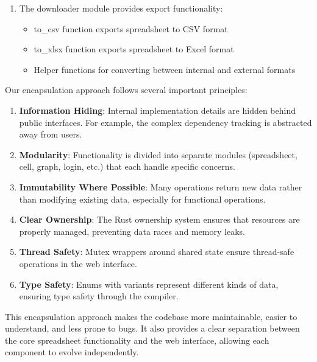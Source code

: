 \documentclass[10pt,a4paper]{article}  %
\begin{document}
\begin{enumerate}
\item The downloader module provides export functionality:
\begin{itemize}
    \item to\_csv function exports spreadsheet to CSV format
    \item to\_xlsx function exports spreadsheet to Excel format
    \item Helper functions for converting between internal and external formats
\end{itemize}
\end{enumerate}

Our encapsulation approach follows several important principles:
\begin{enumerate}
    \item \textbf{Information Hiding}: Internal implementation details are hidden behind public interfaces. For example, the complex dependency tracking is abstracted away from users.
    
    \item \textbf{Modularity}: Functionality is divided into separate modules (spreadsheet, cell, graph, login, etc.) that each handle specific concerns.
    
    \item \textbf{Immutability Where Possible}: Many operations return new data rather than modifying existing data, especially for functional operations.
    
    \item \textbf{Clear Ownership}: The Rust ownership system ensures that resources are properly managed, preventing data races and memory leaks.
    
    \item \textbf{Thread Safety}: Mutex wrappers around shared state ensure thread-safe operations in the web interface.
    
    \item \textbf{Type Safety}: Enums with variants represent different kinds of data, ensuring type safety through the compiler.
\end{enumerate}

This encapsulation approach makes the codebase more maintainable, easier to understand, and less prone to bugs. It also provides a clear separation between the core spreadsheet functionality and the web interface, allowing each component to evolve independently.
\end{document}
